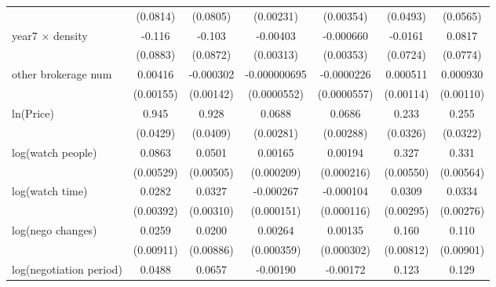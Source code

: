 {\begin{tabular}{l*{6}{c}}
            &    (0.0814)         &    (0.0805)         &   (0.00231)         &   (0.00354)         &    (0.0493)         &    (0.0565)         \\
\addlinespace
year7 $\times$ density&      -0.116         &      -0.103         &    -0.00403         &   -0.000660         &     -0.0161         &      0.0817         \\
            &    (0.0883)         &    (0.0872)         &   (0.00313)         &   (0.00353)         &    (0.0724)         &    (0.0774)         \\
\addlinespace
other brokerage num  &     0.00416\sym{***}&   -0.000302         &-0.000000695         &  -0.0000226         &    0.000511         &    0.000930         \\
            &   (0.00155)         &   (0.00142)         & (0.0000552)         & (0.0000557)         &   (0.00114)         &   (0.00110)         \\
\addlinespace
ln(Price)&       0.945\sym{***}&       0.928\sym{***}&      0.0688\sym{***}&      0.0686\sym{***}&       0.233\sym{***}&       0.255\sym{***}\\
            &    (0.0429)         &    (0.0409)         &   (0.00281)         &   (0.00288)         &    (0.0326)         &    (0.0322)         \\
\addlinespace
log(watch people)&      0.0863\sym{***}&      0.0501\sym{***}&     0.00165\sym{***}&     0.00194\sym{***}&       0.327\sym{***}&       0.331\sym{***}\\
            &   (0.00529)         &   (0.00505)         &  (0.000209)         &  (0.000216)         &   (0.00550)         &   (0.00564)         \\
\addlinespace
log(watch time)&      0.0282\sym{***}&      0.0327\sym{***}&   -0.000267\sym{*}  &   -0.000104         &      0.0309\sym{***}&      0.0334\sym{***}\\
            &   (0.00392)         &   (0.00310)         &  (0.000151)         &  (0.000116)         &   (0.00295)         &   (0.00276)         \\
\addlinespace
log(nego changes)&      0.0259\sym{***}&      0.0200\sym{**} &     0.00264\sym{***}&     0.00135\sym{***}&       0.160\sym{***}&       0.110\sym{***}\\
            &   (0.00911)         &   (0.00886)         &  (0.000359)         &  (0.000302)         &   (0.00812)         &   (0.00901)         \\
\addlinespace
log(negotiation period)&      0.0488\sym{***}&      0.0657\sym{***}&    -0.00190\sym{***}&    -0.00172\sym{***}&       0.123\sym{***}&       0.129\sym{***}\\

\end{tabular}}
